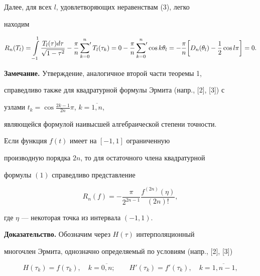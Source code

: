 Далее, для всех $l$, удовлетворяющих неравенствам (3), легко


находим


$$


R_n(T_l) = \int \limits_{-1}^1 \frac{T_l( \tau) d \tau}{ \sqrt{1-


\tau^2}} - \frac{ \pi}{n} \sideset{}{'}\sum_{k=0}^n T_l( \tau_k) =


0 - \frac{ \pi}{n} \sideset{}{'}\sum_{k=0}^n \cos k \theta_l= - \frac{


\pi}{n} \bigg[D_n( \theta_l) - \frac{1}{2} \cos l \pi\bigg] = 0.


$$





{\bf Замечание.} Утверждение, аналогичное второй части теоремы 1,


справедливо также для квадратурной формулы Эрмита (напр., [2], [3]) с


узлами $t_k = \cos \frac{2k-1}{2n} \pi$, $k= \overline{1,n}$,


являющейся формулой наивысшей алгебраической степени точности.





\begin{thm}


Если функция $f(t)$ имеет на $[-1,1]$ ограниченную


производную порядка $2n$, то для остаточного члена квадратурной


формулы $(1)$ справедливо представление


$$


R_n(f)= - \frac{ \pi}{2^{2n-1}} \frac{f^{(2n)}( \eta)}{(2n)!},


$$


где $\eta$ --- некоторая точка из интервала $(-1,1)$.


\end{thm}





{\bf Доказательство.} Обозначим через $H( \tau)$ интерполяционный


многочлен Эрмита, однозначно определяемый по условиям (напр., [2], [3])


\begin{equation}


H ( \tau_k) = f ( \tau_k), \quad k= \overline{0,n}; \qquad H'(


\tau_k)=f'( \tau_k), \quad k= \overline{1,n-1},


\end{equation}


